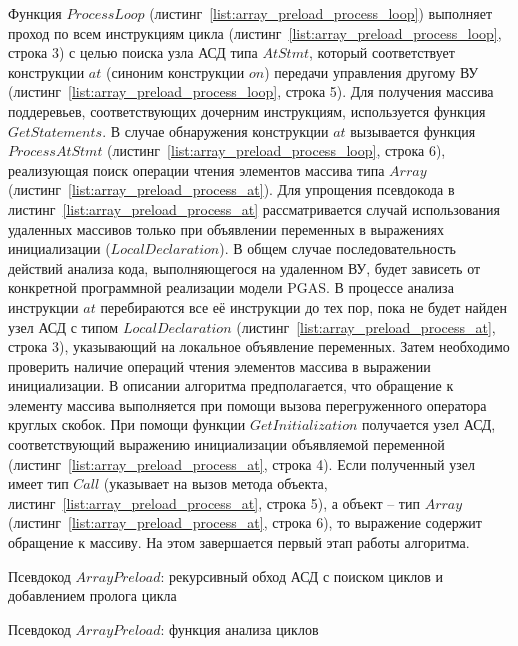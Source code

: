 Функция $ProcessLoop$ (листинг~\ref{list:array_preload_process_loop}) выполняет 
проход по всем инструкциям цикла (листинг~\ref{list:array_preload_process_loop}, 
строка 3) с целью поиска узла АСД типа $AtStmt$, который соответствует 
конструкции $at$ (синоним конструкции $on$) передачи управления другому ВУ 
(листинг~\ref{list:array_preload_process_loop}, строка 5). Для получения массива 
поддеревьев, соответствующих дочерним инструкциям, используется функция 
$GetStatements$. В случае обнаружения конструкции $at$ вызывается функция 
$ProcessAtStmt$ (листинг~\ref{list:array_preload_process_loop}, строка 6), 
реализующая поиск операции чтения элементов массива типа $Array$ 
(листинг~\ref{list:array_preload_process_at}). Для упрощения псевдокода в 
листинг~\ref{list:array_preload_process_at} рассматривается случай использования 
удаленных массивов только при объявлении переменных в выражениях инициализации 
($LocalDeclaration$). В общем случае последовательность действий анализа кода, 
выполняющегося на удаленном ВУ, будет зависеть от конкретной программной 
реализации модели PGAS. В процессе анализа инструкции $at$ перебираются все её 
инструкции до тех пор, пока не будет найден узел АСД с типом $LocalDeclaration$ 
(листинг~\ref{list:array_preload_process_at}, строка 3), указывающий на 
локальное объявление переменных. Затем необходимо проверить наличие операций 
чтения элементов массива в выражении инициализации. В описании алгоритма 
предполагается, что обращение к элементу массива выполняется при помощи вызова 
перегруженного оператора круглых скобок.  При помощи функции $GetInitialization$ 
получается узел АСД, соответствующий выражению инициализации объявляемой 
переменной (листинг~\ref{list:array_preload_process_at}, строка 4). Если 
полученный узел имеет тип $Call$ (указывает на вызов метода объекта, 
листинг~\ref{list:array_preload_process_at}, строка 5), а объект -- тип $Array$ 
(листинг~\ref{list:array_preload_process_at}, строка 6), то выражение содержит 
обращение к массиву. На этом завершается первый этап работы алгоритма.

\begin{ListingEnv}[!h]
	\small {}
    \caption{Псевдокод $ArrayPreload$: рекурсивный обход АСД с поиском циклов и 
добавлением пролога цикла}    
    \label{list:array_preload_visit}
\end{ListingEnv}

\begin{ListingEnv}[!h]
	\small {}
    \caption{Псевдокод $ArrayPreload$: функция анализа циклов}
    \label{list:array_preload_process_loop}
\end{ListingEnv} 
 
